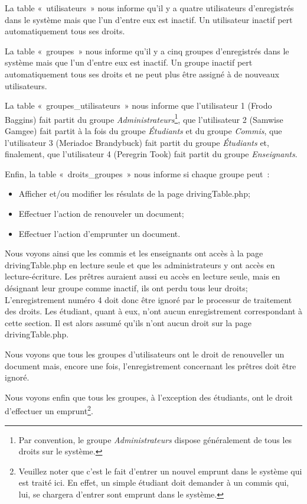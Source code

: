 \documentclass[letter, 10pt]{report}
\begin{document}
La table «~utilisateurs~» nous informe qu'il y a quatre utilisateurs d'enregistrés dans le système mais que l'un d'entre eux est inactif. Un utilisateur inactif pert automatiquement tous ses droits.

La table «~groupes~» nous informe qu'il y a cinq groupes d'enregistrés dans le système mais que l'un d'entre eux est inactif. Un groupe inactif pert automatiquement tous ses droits et ne peut plus être assigné à de nouveaux utilisateurs.

La table «~groupes\_utilisateurs~» nous informe que l'utilisateur 1 (Frodo Baggins) fait partit du groupe \emph{Administrateurs}\footnote{Par convention, le groupe \emph{Administrateurs} dispose généralement de tous les droits sur le système.}, que l'utilisateur 2 (Samwise Gamgee) fait partit à la fois du groupe \emph{Étudiants} et du groupe \emph{Commis}, que l'utilisateur 3 (Meriadoc Brandybuck) fait partit du groupe \emph{Étudiants} et, finalement, que l'utilisateur 4 (Peregrin Took) fait partit du groupe \emph{Enseignants}.

Enfin, la table «~droits\_groupes~» nous informe si chaque groupe peut~:

\begin{itemize}
	\item Afficher et/ou modifier les résulats de la page drivingTable.php;
	\item Effectuer l'action de renouveler un document;
	\item Effectuer l'action d'emprunter un document.
\end{itemize}

Nous voyons ainsi que les commis et les enseignants ont accès à la page drivingTable.php en lecture seule et que les administrateurs y ont accès en lecture-écriture. Les prêtres auraient aussi eu accès en lecture seule, mais en désignant leur groupe comme inactif, ils ont perdu tous leur droits; L'enregistrement numéro 4 doit donc être ignoré par le processur de traitement des droits. Les étudiant, quant à eux, n'ont aucun enregistrement correspondant à cette section. Il est alors assumé qu'ils n'ont aucun droit sur la page drivingTable.php.

Nous voyons que tous les groupes d'utilisateurs ont le droit de renouveller un document mais, encore une fois, l'enregistrement concernant les prêtres doit être ignoré.

Nous voyons enfin que tous les groupes, à l'exception des étudiants, ont le droit d'effectuer un emprunt\footnote{Veuillez noter que c'est le fait d'entrer un nouvel emprunt dans le système qui est traité ici. En effet, un simple étudiant doit demander à un commis qui, lui, se chargera d'entrer sont emprunt dans le système.}.
\end{document}
